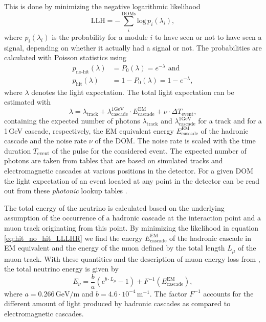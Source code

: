 This is done by minimizing the negative logarithmic likelihood 
\begin{equation}
    \mathrm{LLH} = -\sum_i^{\mathrm{DOMs}} \mathrm{log}\,p_i(\lambda_i)
    ,
    \label{eq:hit_no_hit_LLLHR}
\end{equation}
where $p_i(\lambda_i)$ is the probability for a module $i$ to have seen or not to have seen a signal, depending on whether it actually had a signal or not.
The probabilities are calculated with Poisson statistics using
\begin{equation}
    \begin{split}
        p_{\textrm{no-hit}}(\lambda)  & = P_{\textrm{0}}(\lambda) = e^{-\lambda} \textrm{ and } \\
        p_{\textrm{hit}}(\lambda)  & = 1 - P_{\textrm{0}}(\lambda) =  1 - e^{-\lambda},
        \label{eq:poisson_statistics}
    \end{split}
\end{equation}
where $\lambda$ denotes the light expectation. The total light expectation can be estimated with
\begin{equation}
    \lambda = \lambda_\mathrm{track} + \lambda^{\mathrm{1GeV}}_\mathrm{cascade} \cdot   E^{\mathrm{EM}}_\mathrm{cascade} + \nu \cdot \Delta T_\mathrm{event}
    ,
    \label{eq:light_expectations}
\end{equation}
containing the expected number of photons $\lambda_\mathrm{track}$ and $\lambda^{\mathrm{1GeV}}_\mathrm{cascade}$ for a track and for a 1\,GeV cascade, respectively, the EM equivalent energy $E^{\mathrm{EM}}_\mathrm{cascade}$ of the hadronic cascade and the noise rate $\nu$ of the DOM.
The noise rate is scaled with the time duration $T_\mathrm{event}$ of the pulse for the considered event.
The expected number of photons are taken from tables that are based on simulated tracks and electromagnetic cascades at various positions in the detector.
For a given DOM the light expectation of an event located at any point in the detector can be read out from these \textit{photonic} lookup tables \cite{LUNDBERG2007619}.

The total energy of the neutrino is calculated based on the underlying assumption of the occurrence of a hadronic cascade at the interaction point and a muon track originating from this point.
By minimizing the likelihood in equation \ref{eq:hit_no_hit_LLLHR} we find the energy $E^{\mathrm{EM}}_\mathrm{cascade}$ of the hadronic cascade in EM equivalent and the energy of the muon defined by the total length $L_\mu$ of the muon track.
With these quantities and the description of muon energy loss from \cite{GROOM2001183}, the total neutrino energy is given by
\begin{equation}
    E_\nu = \frac{b}{a} (e^{b \cdot L_\mu} - 1) + F^{-1}(E^{\mathrm{EM}}_\mathrm{cascade})
    ,
    \label{eq:total_neutrino_energy}
\end{equation}
where $a=0.266\,\textrm{GeV/m}$ and $b=4.6\cdot 10^{-4}\,\mathrm{m}^{-1}$. The factor $F^{-1}$ accounts for the different amount of light produced by hadronic cascades as compared to electromagnetic cascades.


